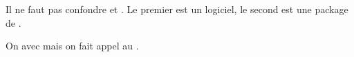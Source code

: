 \begin{attention}
Il ne faut pas confondre  et . Le premier est un logiciel, le second est une package de \logiciel{\LaTex}.

On  avec  mais on fait appel au  .

\end{attention}



 





